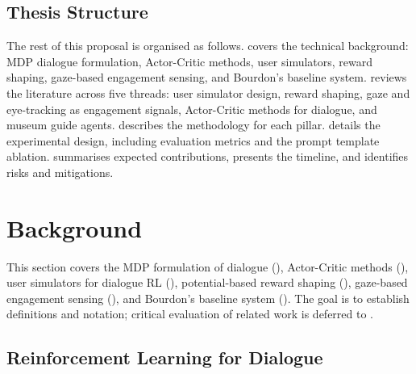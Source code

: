 \documentclass[a4paper, 11pt]{article}
\begin{document}
\subsection{Thesis Structure}
\label{sec:structure}

The rest of this proposal is organised as follows.  covers the technical background: MDP dialogue formulation, Actor-Critic methods, user simulators, reward shaping, gaze-based engagement sensing, and Bourdon's baseline system.  reviews the literature across five threads: user simulator design, reward shaping, gaze and eye-tracking as engagement signals, Actor-Critic methods for dialogue, and museum guide agents.  describes the methodology for each pillar.  details the experimental design, including evaluation metrics and the prompt template ablation.  summarises expected contributions,  presents the timeline, and  identifies risks and mitigations.

\section{Background}
\label{sec:background}

This section covers the MDP formulation of dialogue (), Actor-Critic methods (), user simulators for dialogue RL (), potential-based reward shaping (), gaze-based engagement sensing (), and Bourdon's baseline system (). The goal is to establish definitions and notation; critical evaluation of related work is deferred to .

\subsection{Reinforcement Learning for Dialogue}
\label{sec:bg_rl_dialogue}
\end{document}
